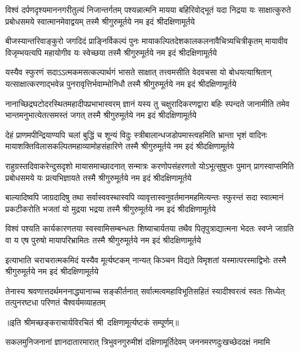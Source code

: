 

\fourlineindentedshloka
{विश्वं दर्पणदृश्यमाननगरीतुल्यं निजान्तर्गतम्}
{पश्यन्नात्मनि मायया बहिरिवोद्भूतं यदा निद्रया}
{यः साक्षात्कुरुते प्रबोधसमये स्वात्मानमेवाद्वयम्}
{तस्मै श्रीगुरुमूर्तये नम इदं श्रीदक्षिणामूर्तये}

\fourlineindentedshloka
{बीजस्यान्तरिवाङ्कुरो जगदिदं प्राङ्\mbox{}निर्विकल्पं पुनः}
{मायाकल्पितदेशकालकलनावैचित्र्यचित्रीकृतम्}
{मायावीव विजृम्भयत्यपि महायोगीव यः स्वेच्छया}
{तस्मै श्रीगुरुमूर्तये नम इदं श्रीदक्षिणामूर्तये}

\fourlineindentedshloka
{यस्यैव स्फुरणं सदाऽऽत्मकमसत्कल्पार्थगं भासते}
{साक्षात् तत्त्वमसीति वेदवचसा यो बोधयत्याश्रितान्}
{यत्साक्षात्करणाद्भवेन्न पुनरावृत्तिर्भवाम्भोनिधौ}
{तस्मै श्रीगुरुमूर्तये नम इदं श्रीदक्षिणामूर्तये}

\fourlineindentedshloka
{नानाच्छिद्रघटोदरस्थितमहादीपप्रभाभास्वरम्}
{ज्ञानं यस्य तु चक्षुरादिकरणद्वारा बहिः स्पन्दते}
{जानामीति तमेव भान्तमनुभात्येतत्समस्तं जगत्}
{तस्मै श्रीगुरुमूर्तये नम इदं श्रीदक्षिणामूर्तये}

\fourlineindentedshloka
{देहं प्राणमपीन्द्रियाण्यपि चलां बुद्धिं च शून्यं विदुः}
{स्त्रीबालान्धजडोपमास्त्वहमिति भ्रान्ता भृशं वादिनः}
{मायाशक्तिविलासकल्पितमहाव्यामोहसंहारिणे}
{तस्मै श्रीगुरुमूर्तये नम इदं श्रीदक्षिणामूर्तये}

\fourlineindentedshloka
{राहुग्रस्तदिवाकरेन्दुसदृशो मायासमाच्छादनात्}
{सन्मात्रः करणोपसंहरणतो योऽभूत्सुषुप्तः पुमान्}
{प्रागस्वाप्समिति प्रबोधसमये यः प्रत्यभिज्ञायते}
{तस्मै श्रीगुरुमूर्तये नम इदं श्रीदक्षिणामूर्तये}

\fourlineindentedshloka
{बाल्यादिष्वपि जाग्रदादिषु तथा सर्वास्ववस्थास्वपि}
{व्यावृत्तास्वनुवर्तमानमहमित्यन्तः स्फुरन्तं सदा}
{स्वात्मानं प्रकटीकरोति भजतां यो मुद्रया भद्रया}
{तस्मै श्रीगुरुमूर्तये नम इदं श्रीदक्षिणामूर्तये}

\fourlineindentedshloka
{विश्वं पश्यति कार्यकारणतया स्वस्वामिसम्बन्धतः}
{शिष्याचार्यतया तथैव पितृपुत्राद्यात्मना भेदतः}
{स्वप्ने जाग्रति वा य एष पुरुषो मायापरिभ्रामितः}
{तस्मै श्रीगुरुमूर्तये नम इदं श्रीदक्षिणामूर्तये}

{इत्याभाति चराचरात्मकमिदं यस्यैव मूर्त्यष्टकम्}
{नान्यत् किञ्चन विद्यते विमृशतां यस्मात्परस्माद्विभोः}
{तस्मै श्रीगुरुमूर्तये नम इदं श्रीदक्षिणामूर्तये}

{तेनास्य श्रवणात्तदर्थमननाद्ध्यानाच्च सङ्कीर्तनात्}
{सर्वात्मत्वमहाविभूतिसहितं स्यादीश्वरत्वं स्वतः}
{सिध्येत् तत्पुनरष्टधा परिणतं चैश्वर्यमव्याहतम्}

॥इति श्रीमच्छङ्कराचार्यविरचितं श्री~दक्षिणामूर्त्यष्टकं सम्पूर्णम्॥

\closesection
{}
{सकलमुनिजनानां ज्ञानदातारमारात्}
{त्रिभुवनगुरुमीशं दक्षिणामूर्तिदेवम्}
{जननमरणदुःखच्छेददक्षं नमामि}